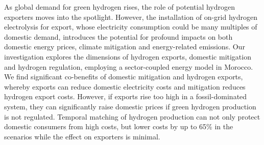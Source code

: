 




As global demand for green hydrogen rises, the role of potential hydrogen exporters moves into the spotlight.
However, the installation of on-grid hydrogen electrolysis for export, whose electricity consumption could be many multiples of domestic demand, introduces the potential for profound impacts on both domestic energy prices, climate mitigation and energy-related emissions. Our investigation explores the dimensions of hydrogen exports, domestic mitigation and hydrogen regulation, employing a sector-coupled energy model in Morocco. 
We find significant co-benefits of domestic mitigation and hydrogen exports, whereby exports can reduce domestic electricity costs and mitigation reduces hydrogen export costs.
However, if exports rise too high in a fossil-dominated system, they can significantly raise domestic prices if green hydrogen production is not regulated.
Temporal matching of hydrogen production can not only protect domestic consumers from high costs, but lower costs by up to 65\% in the scenarios while the effect on exporters is minimal.


